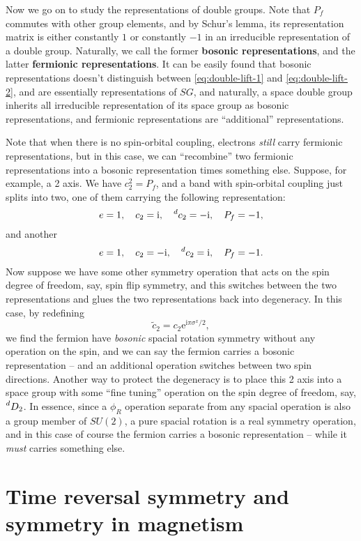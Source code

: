 \documentclass[hyperref, a4paper]{article}
\newcommand*{\ii}{\mathrm{i}}
\newcommand*{\ee}{\mathrm{e}}
\newcommand*{\concept}[1]{{\textbf{#1}}}
\begin{document}
Now we go on to study the representations of double groups. Note that $P_f$ commutes with other group elements,
and by Schur's lemma, its representation matrix is either constantly $1$ or constantly $-1$ in an irreducible representation 
of a double group. Naturally, we call the former \concept{bosonic representations}, and the latter \concept{fermionic representations}.
It can be easily found that bosonic representations doesn't distinguish between \eqref{eq:double-lift-1} 
and \eqref{eq:double-lift-2}, and are essentially representations of $SG$, and naturally, a space double 
group inherits all irreducible representation of its space group as bosonic representations, and 
fermionic representations are ``additional'' representations. 

Note that when there is no spin-orbital coupling, electrons \emph{still} carry fermionic representations,
but in this case, we can ``recombine'' two fermionic representations into a bosonic representation times something else.
Suppose, for example, a 2 axis. We have $c_2^2 = P_f$, and a band with spin-orbital coupling just splits 
into two, one of them carrying the following representation:
\[
    e = 1, \quad c_2 = \ii, \quad \prescript{d}{}{c_2} = - \ii, \quad P_f = -1,
\]
and another 
\[
    e = 1, \quad c_2 = - \ii, \quad \prescript{d}{}{c_2} = \ii, \quad P_f = -1.
\]
Now suppose we have some other symmetry operation that acts on the spin degree of freedom, say,
spin flip symmetry, and this switches between the two representations and glues the two representations back into degeneracy. 
In this case, by redefining 
\begin{equation}
    \tilde{c}_2 = c_2 \ee^{\ii \pi \sigma^x / 2},
\end{equation}
we find the fermion have \emph{bosonic} spacial rotation symmetry without any operation on the spin,
and we can say the fermion carries a bosonic representation -- and an additional operation switches between two spin directions.
Another way to protect the degeneracy is to place this 2 axis into a space group with some ``fine tuning'' 
operation on the spin degree of freedom, say, $\prescript{d}{}{D_2}$.
In essence, since a $\phi_R$ operation separate from any spacial operation is also a group member of $SU(2)$,
a pure spacial rotation is a real symmetry operation, and in this case of course the fermion carries 
a bosonic representation -- while it \emph{must} carries something else.

\section{Time reversal symmetry and symmetry in magnetism}
\end{document}
